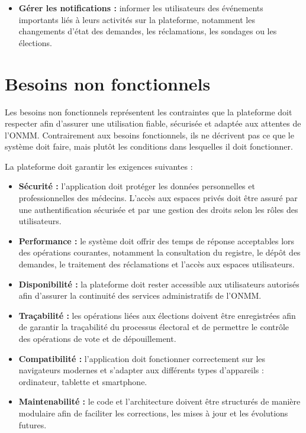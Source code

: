 ﻿\documentclass[12pt,a4paper]{report}
\begin{document}
\begin{itemize}
\item \textbf{Gérer les notifications :}
informer les utilisateurs des événements importants liés à leurs
activités sur la plateforme, notamment les changements d’état des
demandes, les réclamations, les sondages ou les élections.



\end{itemize}

\section{Besoins non fonctionnels}

Les besoins non fonctionnels représentent les contraintes que la
plateforme doit respecter afin d’assurer une utilisation fiable,
sécurisée et adaptée aux attentes de l’ONMM. Contrairement aux besoins
fonctionnels, ils ne décrivent pas ce que le système doit faire, mais
plutôt les conditions dans lesquelles il doit fonctionner.

La plateforme doit garantir les exigences suivantes :

\begin{itemize}

\item \textbf{Sécurité :}
l’application doit protéger les données personnelles et professionnelles
des médecins. L’accès aux espaces privés doit être assuré par une
authentification sécurisée et par une gestion des droits selon les rôles
des utilisateurs.

\item \textbf{Performance :}
le système doit offrir des temps de réponse acceptables lors des
opérations courantes, notamment la consultation du registre, le dépôt des
demandes, le traitement des réclamations et l’accès aux espaces
utilisateurs.

\item \textbf{Disponibilité :}
la plateforme doit rester accessible aux utilisateurs autorisés afin
d’assurer la continuité des services administratifs de l’ONMM.

\item \textbf{Traçabilité :}
les opérations liées aux élections doivent être enregistrées afin de
garantir la traçabilité du processus électoral et de permettre le
contrôle des opérations de vote et de dépouillement.

\item \textbf{Compatibilité :}
l’application doit fonctionner correctement sur les navigateurs modernes
et s’adapter aux différents types d’appareils : ordinateur, tablette et
smartphone.

\item \textbf{Maintenabilité :}
le code et l’architecture doivent être structurés de manière modulaire
afin de faciliter les corrections, les mises à jour et les évolutions
futures.



\end{itemize}
\end{document}
